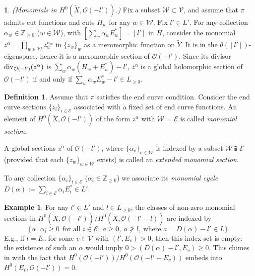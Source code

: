 \documentclass[10pt,a4paper]{amsart}
\numberwithin{equation}{section}
\numberwithin{equation}{subsection}
\theoremstyle{plain}
\theoremstyle{definition}
\newtheorem{definition}[equation]{Definition}
\newtheorem{example}[equation]{Example}
\newtheorem{bekezd}[equation]{}
\begin{document}
\begin{bekezd}\label{ss:mon}{\em (Monomials in
$H^0(\widetilde{X},{\mathcal{O}}(-l'))$.)} Fix a subset ${\mathcal{W}}\subset {\mathcal{V}}$,
and assume that $\pi$ admits cut functions and cuts $H_w$ for any
$w\in {\mathcal{W}}$. Fix $l'\in L'$. For any collection $\alpha_w\in
{\mathbb{Z}}_{\geq 0}$ ($w\in {\mathcal{W}}$), with $[\sum_w\alpha_wE^*_w]=[l']$ in
$H$, consider the monomial $z^\alpha=\prod_{w\in
{\mathcal{W}}}z_w^{\alpha_w}$ in $\{z_w\}_w$ as a meromorphic function on
$\widetilde{Y}$. It is in the $\theta([l'])$-eigenspace, hence it
is a meromorphic section of ${\mathcal{O}}(-l')$. Since its divisor ${\rm
div}_{{\mathcal{O}}(-l')}(z^\alpha)$ is $\sum_w\alpha_w(H_w+E^*_w)-l'$,
$z^\alpha$ is a global holomorphic section of ${\mathcal{O}}(-l')$ if and
only if $\sum_w\alpha_wE_w^*-l'\in L_{\geq 0}$.\end{bekezd}
\begin{definition}\label{def:3.1} Assume that $\pi$ satisfies the end
curve condition. Consider the end curve sections
$\{z_i\}_{i\in{\mathcal{E}}}$ associated with a fixed set of end curve
functions. An element of $H^0(\widetilde{X},{\mathcal{O}}(-l'))$ of the form
$z^\alpha$ with ${\mathcal{W}}={\mathcal{E}}$ is called {\em monomial section}.

A global sections $z^\alpha$ of ${\mathcal{O}}(-l')$, where
$\{\alpha_v\}_{v\in {\mathcal{W}}}$ is indexed by a subset
${\mathcal{W}}\supsetneqq{\mathcal{E}}$ (provided that each $\{z_w\}_{w\in{\mathcal{W}}}$
exists) is called an {\em extended monomial section}.

To any collection $\{\alpha_i\}_{i\in {\mathcal{E}}}$
($\alpha_i\in{\mathbb{Z}}_{\geq 0}$)  we associate its {\em monomial
cycle} $D(\alpha):=\sum_{i\in{\mathcal{E}}}\alpha_iE^*_i\in L'$.
\end{definition}

\begin{example}\label{ex:31}
For any $l'\in L'$ and $l\in L_{\geq 0}$, the classes of non-zero
monomial sections in $H^0(\widetilde{X},{\mathcal{O}}(-l'))/
H^0(\widetilde{X},{\mathcal{O}}(-l'-l))$ are indexed by
\begin{equation*}\label{eq:3.1}
\{\alpha\,|\, \alpha_i\geq 0\ \ \mbox{for all $i\in{\mathcal{E}}$}; \ a\geq
0, \ a\not\geq l, \ \mbox{where $a=D(\alpha)-l'\in L$}\}.
\end{equation*}
E.g., if $l=E_v$ for some $v\in{\mathcal{V}}$ with $(l',E_v)>0$, then this
index set is empty: the existence of such an $\alpha$ would imply
$0>(D(\alpha)-l',E_v)\geq 0$. This chimes in with the fact that
$H^0({\mathcal{O}}(-l'))/ H^0({\mathcal{O}}(-l'-E_v))$ embeds into
$H^0(E_v,{\mathcal{O}}(-l'))=0$.
\end{example}
\end{document}
